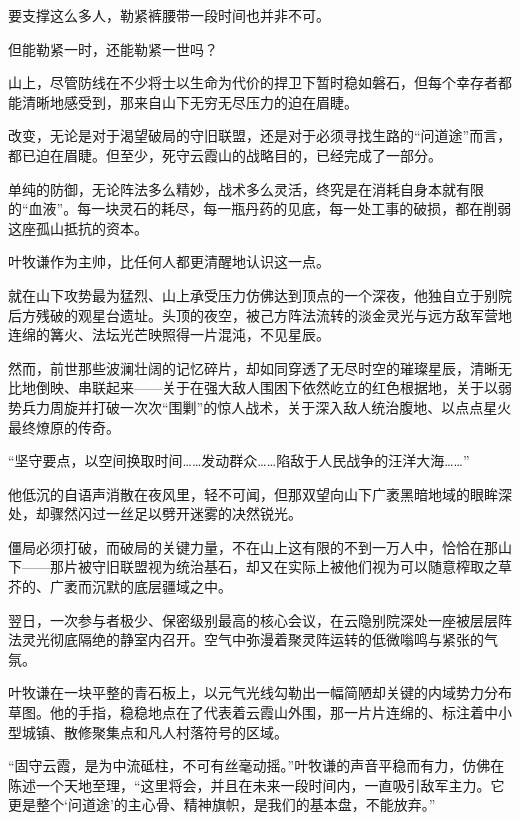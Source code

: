 要支撑这么多人，勒紧裤腰带一段时间也并非不可。

但能勒紧一时，还能勒紧一世吗？

山上，尽管防线在不少将士以生命为代价的捍卫下暂时稳如磐石，但每个幸存者都能清晰地感受到，那来自山下无穷无尽压力的迫在眉睫。

改变，无论是对于渴望破局的守旧联盟，还是对于必须寻找生路的“问道途”而言，都已迫在眉睫。但至少，死守云霞山的战略目的，已经完成了一部分。

单纯的防御，无论阵法多么精妙，战术多么灵活，终究是在消耗自身本就有限的“血液”。每一块灵石的耗尽，每一瓶丹药的见底，每一处工事的破损，都在削弱这座孤山抵抗的资本。

\vspace{2em}

叶牧谦作为主帅，比任何人都更清醒地认识这一点。

就在山下攻势最为猛烈、山上承受压力仿佛达到顶点的一个深夜，他独自立于别院后方残破的观星台遗址。头顶的夜空，被己方阵法流转的淡金灵光与远方敌军营地连绵的篝火、法坛光芒映照得一片混沌，不见星辰。

然而，前世那些波澜壮阔的记忆碎片，却如同穿透了无尽时空的璀璨星辰，清晰无比地倒映、串联起来——关于在强大敌人围困下依然屹立的红色根据地，关于以弱势兵力周旋并打破一次次“围剿”的惊人战术，关于深入敌人统治腹地、以点点星火最终燎原的传奇。

“坚守要点，以空间换取时间……发动群众……陷敌于人民战争的汪洋大海……”

他低沉的自语声消散在夜风里，轻不可闻，但那双望向山下广袤黑暗地域的眼眸深处，却骤然闪过一丝足以劈开迷雾的决然锐光。

僵局必须打破，而破局的关键力量，不在山上这有限的不到一万人中，恰恰在那山下——那片被守旧联盟视为统治基石，却又在实际上被他们视为可以随意榨取之草芥的、广袤而沉默的底层疆域之中。

\vspace{2em}

翌日，一次参与者极少、保密级别最高的核心会议，在云隐别院深处一座被层层阵法灵光彻底隔绝的静室内召开。空气中弥漫着聚灵阵运转的低微嗡鸣与紧张的气氛。

叶牧谦在一块平整的青石板上，以元气光线勾勒出一幅简陋却关键的内域势力分布草图。他的手指，稳稳地点在了代表着云霞山外围，那一片片连绵的、标注着中小型城镇、散修聚集点和凡人村落符号的区域。

“固守云霞，是为中流砥柱，不可有丝毫动摇。”叶牧谦的声音平稳而有力，仿佛在陈述一个天地至理，“这里将会，并且在未来一段时间内，一直吸引敌军主力。它更是整个‘问道途’的主心骨、精神旗帜，是我们的基本盘，不能放弃。”

